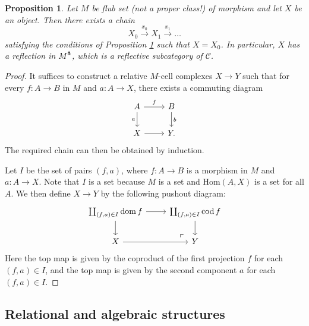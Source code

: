 \documentclass[a4paper]{article}
\newtheorem{proposition}[theorem]{Proposition}
\theoremstyle{remark}
\theoremstyle{definition}
\begin{document}
\begin{proposition}
  \label{prop:orth-refl-constr-exist}
  Let $M$ be flub set (not a proper class!) of morphism and let $X$ be an object.
  Then there exists a chain
  \begin{equation}
    X_0 \xrightarrow{x_0} X_1 \xrightarrow{x_1} \dots
  \end{equation}
  satisfying the conditions of Proposition \ref{prop:orth-refl-constr-exist} such that $X = X_0$.
  In particular, $X$ has a reflection in $M^\pitchfork$, which is a reflective subcategory of $\mathcal{C}$.
\end{proposition}
\begin{proof}
  It suffices to construct a relative $M$-cell complexes $X \rightarrow Y$ such that for every $f : A \rightarrow B$ in $M$ and $a : A \rightarrow X$, there exists a commuting diagram
  \begin{equation}
    \begin{tikzcd}
      A \arrow[r, "f"] \arrow[d, "a"'] & B \arrow[d, "b"] \\
      X \arrow[r] & Y.
    \end{tikzcd}
  \end{equation}
  The required chain can then be obtained by induction.

  Let $I$ be the set of pairs $(f, a)$, where $f : A \rightarrow B$ is a morphism in $M$ and $a : A \rightarrow X$.
  Note that $I$ is a set because $M$ is a set and $\mathrm{Hom}(A, X)$ is a set for all $A$.
  We then define $X \rightarrow Y$ by the following pushout diagram:
  \begin{equation}
    \begin{tikzcd}
      \coprod_{(f, a) \in I} \operatorname{dom} f \arrow[r] \arrow[d] \arrow[dr, phantom, very near end, "\ulcorner"] & \coprod_{(f, a) \in I} \operatorname{cod} f \arrow[d] \\
      X \arrow[r] & Y
    \end{tikzcd}
  \end{equation}
  Here the top map is given by the coproduct of the first projection $f$ for each $(f, a) \in I$, and the top map is given by the second component $a$ for each $(f, a) \in I$.
\end{proof}

\subsection{Relational and algebraic structures}
\end{document}

